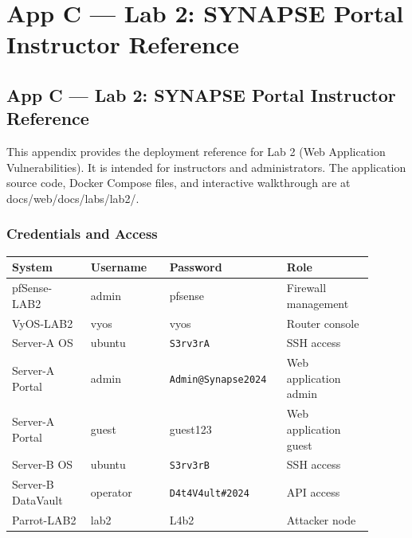\chapter{App C --- Lab 2: SYNAPSE Portal Instructor Reference}

\section{App C --- Lab 2: SYNAPSE Portal Instructor Reference}

This appendix provides the deployment reference for Lab 2 (Web Application Vulnerabilities). It is intended for instructors and administrators. The application source code, Docker Compose files, and interactive walkthrough are at docs/web/docs/labs/lab2/.

\subsection{Credentials and Access}

{\footnotesize\begin{longtable}[]{@{}
  >{\raggedright\arraybackslash}p{0.20\linewidth}
  >{\raggedright\arraybackslash}p{0.20\linewidth}
  >{\raggedright\arraybackslash}p{0.28\linewidth}
  >{\raggedright\arraybackslash}p{0.22\linewidth}@{}}
\toprule\noalign{}
\begin{minipage}[b]{\linewidth}\raggedright
\textbf{System}
\end{minipage} & \begin{minipage}[b]{\linewidth}\raggedright
\textbf{Username}
\end{minipage} & \begin{minipage}[b]{\linewidth}\raggedright
\textbf{Password}
\end{minipage} & \begin{minipage}[b]{\linewidth}\raggedright
\textbf{Role}
\end{minipage} \\
\midrule\noalign{}
\endhead
\bottomrule\noalign{}
\endlastfoot
pfSense-LAB2 & admin & pfsense & Firewall management \\
VyOS-LAB2 & vyos & vyos & Router console \\
Server-A OS & ubuntu & \texttt{S3rv3rA} & SSH access \\
Server-A Portal & admin & \texttt{Admin@Synapse2024} & Web application admin \\
Server-A Portal & guest & guest123 & Web application guest \\
Server-B OS & ubuntu & \texttt{S3rv3rB} & SSH access \\
Server-B DataVault & operator & \texttt{D4t4V4ult\#2024} & API access \\
Parrot-LAB2 & lab2 & L4b2 & Attacker node \\
\end{longtable}}

